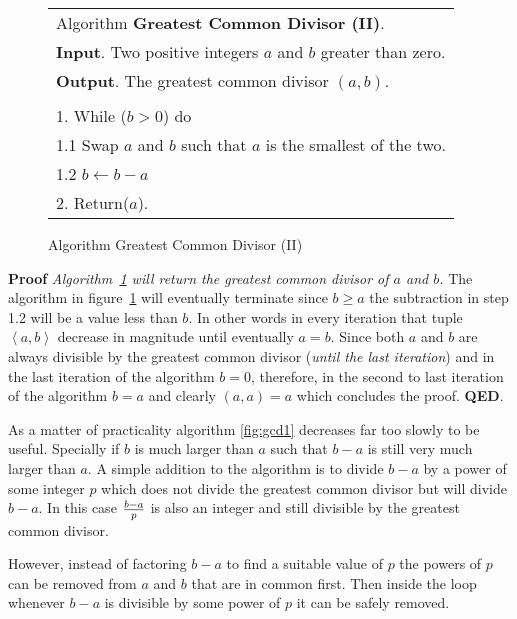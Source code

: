 \documentclass[b5paper]{book}
\begin{document}
\begin{figure}[!here]
\begin{small}
\begin{center}
\begin{tabular}{l}
\hline Algorithm \textbf{Greatest Common Divisor (II)}. \\
\textbf{Input}.   Two positive integers $a$ and $b$ greater than zero. \\
\textbf{Output}.  The greatest common divisor $(a, b)$.  \\
\hline \\
1.  While ($b > 0$) do \\
\hspace{3mm}1.1  Swap $a$ and $b$ such that $a$ is the smallest of the two. \\
\hspace{3mm}1.2  $b \leftarrow b - a$ \\
2.  Return($a$). \\
\hline
\end{tabular}
\end{center}
\end{small}
\caption{Algorithm Greatest Common Divisor (II)}
\label{fig:gcd2}
\end{figure}

\textbf{Proof} \textit{Algorithm~\ref{fig:gcd2} will return the greatest common divisor of $a$ and $b$.}
The algorithm in figure~\ref{fig:gcd2} will eventually terminate since $b \ge a$ the subtraction in step 1.2 will be a value less than $b$.  In other
words in every iteration that tuple $\left < a, b \right >$ decrease in magnitude until eventually $a = b$.  Since both $a$ and $b$ are always 
divisible by the greatest common divisor (\textit{until the last iteration}) and in the last iteration of the algorithm $b = 0$, therefore, in the 
second to last iteration of the algorithm $b = a$ and clearly $(a, a) = a$ which concludes the proof.  \textbf{QED}.

As a matter of practicality algorithm \ref{fig:gcd1} decreases far too slowly to be useful.  Specially if $b$ is much larger than $a$ such that 
$b - a$ is still very much larger than $a$.  A simple addition to the algorithm is to divide $b - a$ by a power of some integer $p$ which does
not divide the greatest common divisor but will divide $b - a$.  In this case ${b - a} \over p$ is also an integer and still divisible by
the greatest common divisor.

However, instead of factoring $b - a$ to find a suitable value of $p$ the powers of $p$ can be removed from $a$ and $b$ that are in common first.  
Then inside the loop whenever $b - a$ is divisible by some power of $p$ it can be safely removed.  
\end{document}
